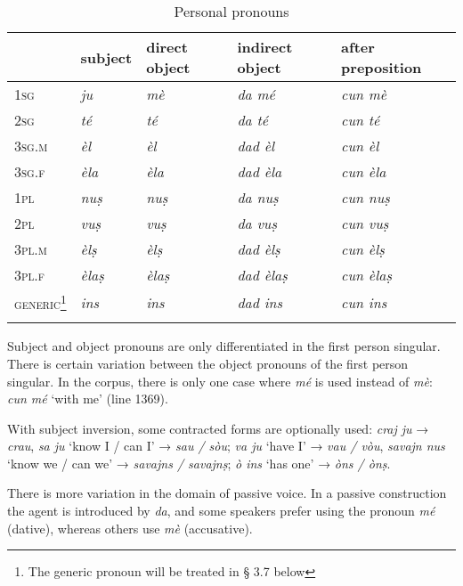 \begin{table}
\caption{Personal pronouns}
\label{tab:perspron}
 \begin{tabular}{lllll}
  \lsptoprule
 &  subject & direct object & indirect object & after preposition\\
  \midrule
\textsc{1sg} & \textit{ju} & \textit{mè} & \textit{da mé} & \textit{cun mè} \\
\textsc{2sg} & \textit{té} & \textit{té} & \textit{da té} & \textit{cun té}\\
\textsc{3sg.m} & \textit{èl} & \textit{èl} & \textit{dad èl} & \textit{cun èl} \\
\textsc{3sg.f} & \textit{èla} & \textit{èla} & \textit{dad èla} & \textit{cun èla}\\
\textsc{1pl} & \textit{nuṣ} & \textit{nuṣ} & \textit{da nuṣ} & \textit{cun nuṣ}\\
\textsc{2pl} & \textit{vuṣ} & \textit{vuṣ} & \textit{da vuṣ} & \textit{cun vuṣ}\\
\textsc{3pl.m} & \textit{èlṣ} & \textit{èlṣ} & \textit{dad èlṣ} & \textit{cun èlṣ}\\
\textsc{3pl.f} & \textit{èlaṣ} & \textit{èlaṣ} & \textit{dad èlaṣ} & \textit{cun èlaṣ}\\
\textsc{generic}\footnote{The generic pronoun will be treated in § 3.7 below} & \textit{ins} & \textit{ins} & \textit{dad ins} & \textit{cun ins}\\
 \lspbottomrule
 \end{tabular}
\end{table}

Subject and object pronouns are only differentiated in the first person singular. There is certain variation between the object pronouns of the first person singular. In the corpus, there is only one case where \textit{mé} is used instead of \textit{mè}: \textit{cun mé} `with me' (line 1369).

With subject inversion, some contracted forms are optionally used: \textit{craj ju} → \textit{crau}, \textit{sa ju} `know I / can I' → \textit{sau / sòu}; \textit{va ju} `have I' → \textit{vau / vòu}, \textit{savajn nus} `know we / can we' → \textit{savajns / savajnṣ}; \textit{ò ins} `has one' → \textit{òns / ònṣ}.

There is more variation in the domain of passive voice. In a passive construction the agent is introduced by \textit{da}, and some speakers prefer using the pronoun \textit{mé} (dative), whereas others use \textit{mè} (accusative).

